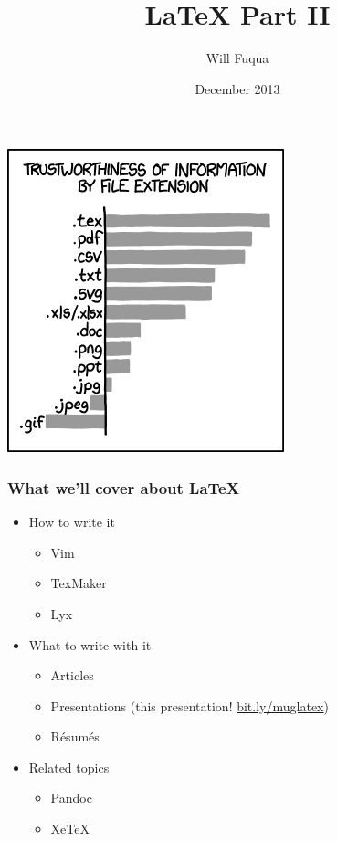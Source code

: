 \documentclass{beamer}
\author{Will Fuqua}
\title{\LaTeX{} Part II}
\institute{Michigan!/usr/group}
\date{December 2013}
\begin{document}
\begin{frame}[t,plain]
    \titlepage
\end{frame}

\begin{frame}
    \begin{center}
        \includegraphics[width=0.8\textheight]{img/file_extensions.png}
    \end{center}
\end{frame}

\begin{frame}
    \frametitle{What we'll cover about \LaTeX}
    \begin{itemize}
        \item How to write it
            \begin{itemize}
                \item Vim
                \item TexMaker
                \item Lyx
            \end{itemize}
            \pause
        \item What to write with it
            \begin{itemize}
                \item Articles
                \item Presentations 
                    (this presentation! \href{http://bit.ly/muglatex}{bit.ly/muglatex})
                \item R\'{e}sum\'{e}s
            \end{itemize}
            \pause
        \item Related topics
            \begin{itemize}
                \item Pandoc
                \item XeTeX
            \end{itemize}
    \end{itemize}
\end{frame}
\end{document}
